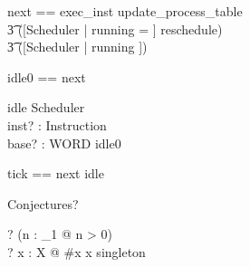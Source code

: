 \begin{syntax}
    next == exec\_inst \pipe update\_process\_table \semi\\
	    \t3 ([\Delta Scheduler | running = \emptyset] \land reschedule) \lor\\
	    \t3 ([\Xi Scheduler | running \neq \emptyset])
\end{syntax}

\begin{syntax}
    idle0 == \lnot \pre next
\end{syntax}

\begin{schema}{idle}
    \Xi Scheduler\\
    inst? : Instruction\\
    base? : WORD
\where
    idle0
\end{schema}

\begin{syntax}
    tick == next \lor idle
\end{syntax}

Conjectures?
\begin{syntax}
    \models? (\forall n : \nat_1 @ n > 0)\\
    [X] \models? \forall x : \power X @ \#x  \iff x \in singleton
\end{syntax}
